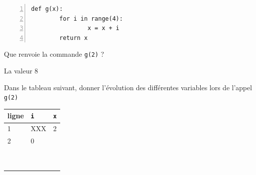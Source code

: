 \documentclass[a4paper,12pt,openany]{book}
\begin{document}
\begin{minipage}{9cm}
	\begin{lstlisting}[numbers=left]
def g(x):
		for i in range(4):
				x = x + i
		return x
\end{lstlisting}

\begin{liste}
	\item 	Que renvoie la commande \verb+g(2)+ ? \dotfill
	
	La valeur 8
	\end{liste}\end{minipage}
\begin{minipage}{9cm}

\begin{liste}
	\item Dans le tableau suivant, donner l'évolution des différentes variables lors de l'appel \verb+g(2)+
	
\renewcommand{\arraystretch}{1.2}	
\begin{tabular}{|p{2cm}|p{2cm}|p{2cm}|}
\hline
ligne & \verb+i+ & \verb+x+  \\ \hline
1 & XXX & 2\\ \hline
2 & 0 & \\ \hline
& & \\ \hline
& & \\ \hline
& & \\ \hline
& & \\ \hline
& & \\ \hline
& & \\ \hline
& & \\ \hline
& & \\ \hline
& & \\ \hline

\end{tabular}	
	
\end{liste}\end{minipage}	






	
	\bigskip
	
\exo 
\end{document}
